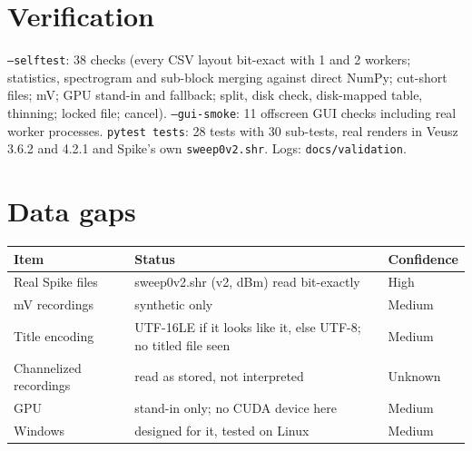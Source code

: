 \documentclass[11pt,a4paper]{article}
\newcommand{\code}[1]{\texttt{#1}}
\begin{document}
\section{Verification}
\code{--selftest}: 38 checks (every CSV layout bit-exact with 1 and 2 workers; statistics, spectrogram and
sub-block merging against direct NumPy; cut-short files; mV; GPU stand-in and fallback; split, disk check,
disk-mapped table, thinning; locked file; cancel). \code{--gui-smoke}: 11 offscreen GUI checks including real
worker processes. \code{pytest tests}: 28 tests with 30 sub-tests, real renders in Veusz 3.6.2 and 4.2.1 and
Spike's own \code{sweep0v2.shr}. Logs: \code{docs/validation}.

\section{Data gaps}
\begin{longtable}{p{4.2cm}p{8.6cm}l}
\toprule
\textbf{Item} & \textbf{Status} & \textbf{Confidence}\\
\midrule
\endhead
Real Spike files & sweep0v2.shr (v2, dBm) read bit-exactly & High\\
mV recordings & synthetic only & Medium\\
Title encoding & UTF-16LE if it looks like it, else UTF-8; no titled file seen & Medium\\
Channelized recordings & read as stored, not interpreted & Unknown\\
GPU & stand-in only; no CUDA device here & Medium\\
Windows & designed for it, tested on Linux & Medium\\
\bottomrule
\end{longtable}

\appendix
\end{document}
